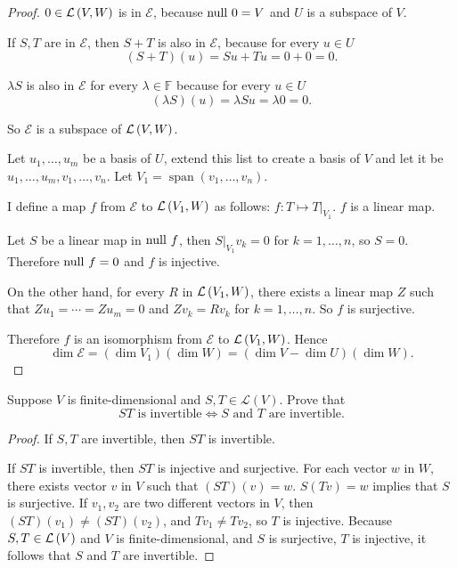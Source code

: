 \begin{proof}
    $0\in \mathcal{L}\left({V, W}\right)$ is in $\mathcal{E}$, because $\operatorname{null}\,{0} = V$ and $U$ is a subspace of $V$.

    If $S, T$ are in $\mathcal{E}$, then $S + T$ is also in $\mathcal{E}$, because for every $u\in U$
    \[
        (S + T)(u) = Su + Tu = 0 + 0 = 0.
    \]

    $\lambda S$ is also in $\mathcal{E}$ for every $\lambda\in\mathbb{F}$ because for every $u\in U$
    \[
        (\lambda S)(u) = \lambda Su = \lambda 0 = 0.
    \]

    So $\mathcal{E}$ is a subspace of $\mathcal{L}\left({V, W}\right)$.

    \bigskip

    Let $u_{1}, \ldots, u_{m}$ be a basis of $U$, extend this list to create a basis of $V$ and let it be $u_{1}, \ldots, u_{m}, v_{1}, \ldots, v_{n}$. Let $V_{1} = \operatorname{span}(v_{1}, \ldots, v_{n})$.

    I define a map $f$ from $\mathcal{E}$ to $\mathcal{L}\left({V_{1}, W}\right)$ as follows: $f: T\mapsto T\vert_{V_{1}}$. $f$ is a linear map.

    Let $S$ be a linear map in $\operatorname{null}\,{f}$, then $S\vert_{V_{1}}v_{k} = 0$ for $k = 1, \ldots, n$, so $S = 0$. Therefore $\operatorname{null}\,{f} = 0$ and $f$ is injective.

    On the other hand, for every $R$ in $\mathcal{L}\left({V_{1}, W}\right)$, there exists a linear map $Z$ such that $Zu_{1} = \cdots = Zu_{m} = 0$ and $Zv_{k} = Rv_{k}$ for $k = 1, \ldots, n$. So $f$ is surjective.

    Therefore $f$ is an isomorphism from $\mathcal{E}$ to $\mathcal{L}\left({V_{1}, W}\right)$. Hence
    \[
        \dim\mathcal{E} = (\dim V_{1})(\dim W) = (\dim V - \dim U)(\dim W).
    \]
\end{proof}
\newpage

\begin{exercise}\label{chapter3:sectionD:exercise11}
    Suppose $V$ is finite-dimensional and $S, T \in \mathcal{L}(V)$. Prove that
    \[
        \text{$ST$ is invertible} \Longleftrightarrow \text{$S$ and $T$ are invertible.}
    \]
\end{exercise}

\begin{proof}
    If $S, T$ are invertible, then $ST$ is invertible.

    If $ST$ is invertible, then $ST$ is injective and surjective. For each vector $w$ in $W$, there exists vector $v$ in $V$ such that $(ST)(v) = w$. $S(Tv) = w$ implies that $S$ is surjective. If $v_{1}, v_{2}$ are two different vectors in $V$, then $(ST)(v_{1})\ne (ST)(v_{2})$, and $Tv_{1}\ne Tv_{2}$, so $T$ is injective. Because $S, T\in\mathcal{L}\left({V}\right)$ and $V$ is finite-dimensional, and $S$ is surjective, $T$ is injective, it follows that $S$ and $T$ are invertible.
\end{proof}
\newpage

